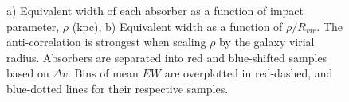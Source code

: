 \documentclass[iop]{emulateapj-rtx4}
\begin{document}


\begin{figure}[t]
\centering
{}
\caption{\small{a) Equivalent width of each absorber as a function of impact parameter, $\rho$ (kpc), b) Equivalent width as a function of $\rho/R_{vir}$. The anti-correlation is strongest when scaling $\rho$ by the galaxy virial radius. Absorbers are separated into red and blue-shifted samples based on $\Delta v$. Bins of mean $EW$ are overplotted in red-dashed, and blue-dotted lines for their respective samples.}}
\vspace{5pt}
\end{figure}
\end{document}
